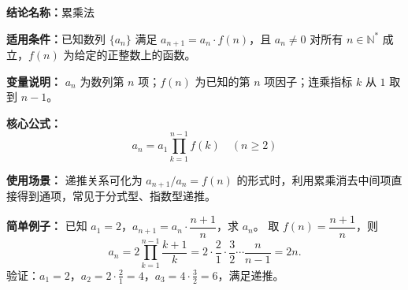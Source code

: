 \textbf{结论名称：}累乘法

\textbf{适用条件：}已知数列 \(\{a_n\}\) 满足 \(a_{n+1}=a_n\cdot f(n)\)，且 \(a_n\neq 0\) 对所有 \(n\in\mathbb{N}^*\) 成立，\(f(n)\) 为给定的正整数上的函数。

\textbf{变量说明：} \(a_n\) 为数列第 \(n\) 项；\(f(n)\) 为已知的第 \(n\) 项因子；连乘指标 \(k\) 从 \(1\) 取到 \(n-1\)。

\textbf{核心公式：}
\[
\boxed{a_n = a_1\prod_{k=1}^{n-1}f(k)\quad (n\geqslant 2)}
\]

\textbf{使用场景：} 递推关系可化为 \(a_{n+1}/a_n = f(n)\) 的形式时，利用累乘消去中间项直接得到通项，常见于分式型、指数型递推。

\textbf{简单例子：} 已知 \(a_1=2\)，\(a_{n+1}=a_n\cdot\dfrac{n+1}{n}\)，求 \(a_n\)。
取 \(f(n)=\dfrac{n+1}{n}\)，则
\[
a_n = 2\prod_{k=1}^{n-1}\frac{k+1}{k} = 2\cdot\frac{2}{1}\cdot\frac{3}{2}\cdots\frac{n}{n-1}=2n.
\]
验证：\(a_1=2\)，\(a_2=2\cdot\frac{2}{1}=4\)，\(a_3=4\cdot\frac{3}{2}=6\)，满足递推。